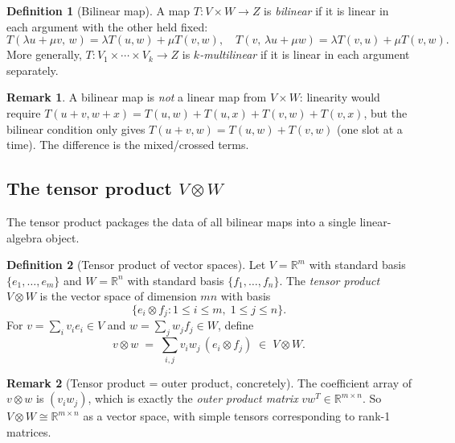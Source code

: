 \documentclass[11pt]{article}
\theoremstyle{definition}
\newtheorem{definition}{Definition}[section]
\newtheorem{remark}{Remark}[section]
\theoremstyle{plain}
\begin{document}
\begin{definition}[Bilinear map]
  A map $T: V\times W \to Z$ is \emph{bilinear} if it is linear in each
  argument with the other held fixed:
  \[
    T(\lambda u + \mu v,\, w) = \lambda T(u,w)+\mu T(v,w), \quad
    T(v,\, \lambda u + \mu w) = \lambda T(v,u)+\mu T(v,w).
  \]
  More generally, $T: V_1\times\cdots\times V_k\to Z$ is
  \emph{$k$-multilinear} if it is linear in each argument separately.
\end{definition}

\begin{remark}
  A bilinear map is \emph{not} a linear map from $V\times W$: linearity
  would require $T(u+v, w+x) = T(u,w)+T(u,x)+T(v,w)+T(v,x)$, but the
  bilinear condition only gives $T(u+v,w) = T(u,w)+T(v,w)$ (one slot
  at a time).  The difference is the mixed/crossed terms.
\end{remark}

\subsection{The tensor product $V\otimes W$}

The tensor product packages the data of all bilinear maps into a single
linear-algebra object.

\begin{definition}[Tensor product of vector spaces]
  Let $V=\mathbb{R}^m$ with standard basis $\{e_1,\ldots,e_m\}$ and
  $W=\mathbb{R}^n$ with standard basis $\{f_1,\ldots,f_n\}$.
  The \emph{tensor product} $V\otimes W$ is the vector space of dimension
  $mn$ with basis
  \[
    \bigl\{e_i\otimes f_j : 1\le i\le m,\; 1\le j\le n\bigr\}.
  \]
  For $v=\sum_i v_i e_i\in V$ and $w=\sum_j w_j f_j\in W$, define
  \[
    v\otimes w
    \;=\; \sum_{i,j} v_i w_j\,(e_i\otimes f_j)
    \;\in\; V\otimes W.
  \]
\end{definition}

\begin{remark}[Tensor product = outer product, concretely]
  The coefficient array of $v\otimes w$ is $(v_i w_j)$, which is exactly
  the \emph{outer product matrix} $vw^T\in\mathbb{R}^{m\times n}$.
  So $V\otimes W \cong \mathbb{R}^{m\times n}$ as a vector space, with
  simple tensors corresponding to rank-1 matrices.
\end{remark}
\end{document}
